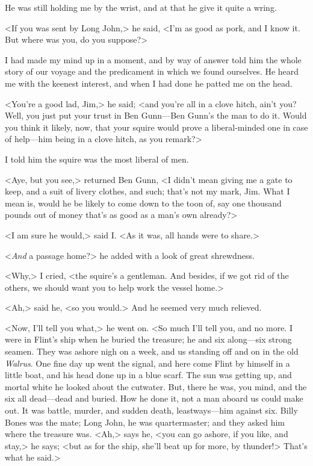 He was still holding me by the wrist, and at that he give it quite a wring.

<If you was sent by Long John,> he said, <I'm as good as pork, and I know it. But where was you, do you suppose?>

I had made my mind up in a moment, and by way of answer told him the whole story of our voyage and the predicament in which we found ourselves. He heard me with the keenest interest, and when I had done he patted me on the head.

<You're a good lad, Jim,> he said; <and you're all in a clove hitch, ain't you? Well, you just put your trust in Ben Gunn—Ben Gunn's the man to do it. Would you think it likely, now, that your squire would prove a liberal-minded one in case of help—him being in a clove hitch, as you remark?>

I told him the squire was the most liberal of men.

<Aye, but you see,> returned Ben Gunn, <I didn't mean giving me a gate to keep, and a suit of livery clothes, and such; that's not my mark, Jim. What I mean is, would he be likely to come down to the toon of, say one thousand pounds out of money that's as good as a man's own already?>

<I am sure he would,> said I\@. <As it was, all hands were to share.>

<\textit{And} a passage home?> he added with a look of great shrewdness.

<Why,> I cried, <the squire's a gentleman. And besides, if we got rid of the others, we should want you to help work the vessel home.>

<Ah,> said he, <so you would.> And he seemed very much relieved.

<Now, I'll tell you what,> he went on. <So much I'll tell you, and no more. I were in Flint's ship when he buried the treasure; he and six along—six strong seamen. They was ashore nigh on a week, and us standing off and on in the old \textit{Walrus}. One fine day up went the signal, and here come Flint by himself in a little boat, and his head done up in a blue scarf. The sun was getting up, and mortal white he looked about the cutwater. But, there he was, you mind, and the six all dead—dead and buried. How he done it, not a man aboard us could make out. It was battle, murder, and sudden death, leastways—him against six. Billy Bones was the mate; Long John, he was quartermaster; and they asked him where the treasure was. <Ah,> says he, <you can go ashore, if you like, and stay,> he says; <but as for the ship, she'll beat up for more, by thunder!> That's what he said.>

